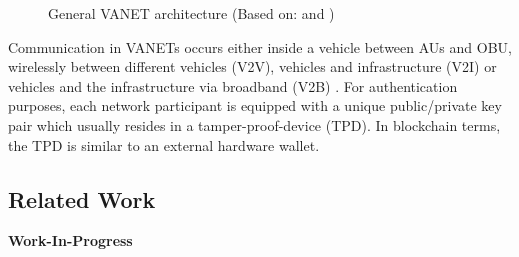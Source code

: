 \documentclass{llncs}
\begin{document}
{\begin{figure}[ht]
				\caption{General VANET architecture (Based on: \protect\cite{baldessari2007car} and \cite{leiding2016self})}
				\label{fig:vanets}
			\end{figure}			
			Communication in VANETs occurs either inside a vehicle between AUs and OBU, wirelessly between different vehicles (V2V), vehicles and infrastructure (V2I) or vehicles and the infrastructure via broadband (V2B) \cite{faezipour2012progress}. For authentication purposes, each network participant is equipped with a unique public/private key pair which usually resides in a tamper-proof-device (TPD). In blockchain terms, the TPD is similar to an external hardware wallet.
			
		
		\subsection{Related Work}
			\label{ss:related-work}

			\textbf{Work-In-Progress}

			
%			
%			
%			
%		

}
\end{document}

